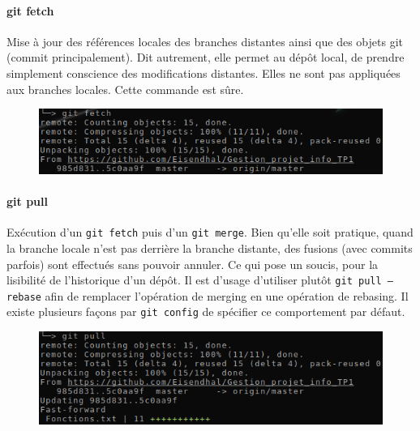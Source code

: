 \documentclass[11pt,canadien]{article}
\begin{document}
\paragraph{git fetch}Mise à jour des références locales des branches distantes ainsi que des objets git (commit principalement). Dit autrement, elle permet au dépôt local, de prendre simplement conscience des modifications distantes. Elles ne sont pas appliquées aux branches locales. Cette commande est sûre.
\begin{figure}[h]
	\centering
	\includegraphics{images/git_fetch.png}
\end{figure}

\paragraph{git pull}Exécution d'un \texttt{git fetch} puis d'un \texttt{git merge}. Bien qu'elle soit pratique, quand la branche locale n'est pas derrière la branche distante, des fusions (avec commits parfois) sont effectués sans pouvoir annuler. Ce qui pose un soucis, pour la lisibilité de l'historique d'un dépôt. Il est d'usage d'utiliser plutôt \texttt{git pull --rebase} afin de remplacer l'opération de merging en une opération de rebasing. Il existe plusieurs façons par \texttt{git config} de spécifier ce comportement par défaut.
\begin{figure}[h]
	\centering
	\includegraphics{images/git_pull.png}
\end{figure}
\end{document}
